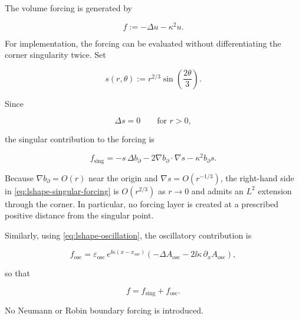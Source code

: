 The volume forcing is generated by

\begin{equation}
\label{eq:lshape-forcing}
  f
  :=
  -\Delta u-\kappa^2u.
\end{equation}

For implementation, the forcing can be evaluated without differentiating
the corner singularity twice. Set

\[
  s(r,\theta)
  :=
  r^{2/3}\sin\!\left(\frac{2\theta}{3}\right).
\]

Since

\[
  \Delta s=0
  \qquad\text{for }r>0,
\]

the singular contribution to the forcing is

\begin{equation}
\label{eq:lshape-singular-forcing}
  f_{\mathrm{sing}}
  =
  -s\,\Delta b_{\partial}
  -2\nabla b_{\partial}\cdot\nabla s
  -\kappa^2 b_{\partial}s.
\end{equation}

Because
$\nabla b_{\partial}=O(r)$ near the origin and
$\nabla s=O(r^{-1/3})$, the right-hand side in
\eqref{eq:lshape-singular-forcing} is $O(r^{2/3})$ as $r\to0$ and admits
an $L^2$ extension through the corner. In particular, no forcing layer is
created at a prescribed positive distance from the singular point.

Similarly, using
\eqref{eq:lshape-oscillation}, the oscillatory contribution is

\begin{equation}
\label{eq:lshape-oscillatory-forcing}
  f_{\mathrm{osc}}
  =
  \varepsilon_{\mathrm{osc}}\,
  e^{\ii\kappa(x-x_{\mathrm{osc}})}
  \left(
    -\Delta A_{\mathrm{osc}}
    -2\ii\kappa\,
    \partial_x A_{\mathrm{osc}}
  \right),
\end{equation}

so that

\begin{equation}
\label{eq:lshape-forcing-split}
  f
  =
  f_{\mathrm{sing}}
  +
  f_{\mathrm{osc}}.
\end{equation}

No Neumann or Robin boundary forcing is introduced.


